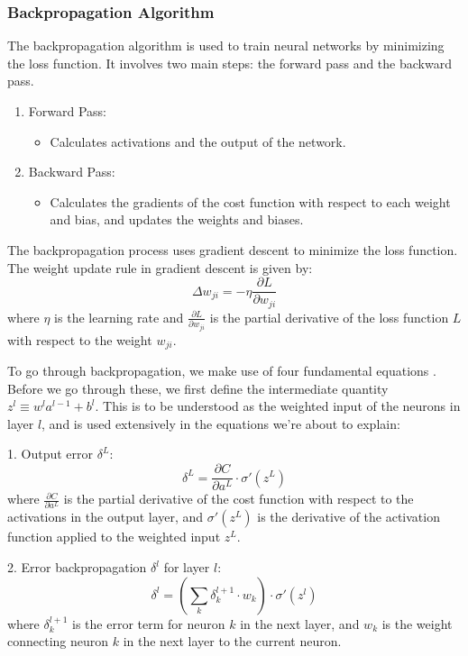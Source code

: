 \documentclass[english,11pt,a4paper,titlepage]{article}
\begin{document}
	\subsubsection*{Backpropagation Algorithm}
	The backpropagation algorithm is used to train neural networks by minimizing the loss function. It involves two main steps: the forward pass and the backward pass. 
	
	\begin{enumerate}
		\item Forward Pass:
		\begin{itemize}
			\item Calculates activations and the output of the network.
		\end{itemize}
		\item Backward Pass:
		\begin{itemize}
			\item Calculates the gradients of the cost function with respect to each weight and bias, and updates the weights and biases.
		\end{itemize}
	\end{enumerate}
	
	The backpropagation process uses gradient descent to minimize the loss function. The weight update rule in gradient descent is given by:
	\begin{equation*}
		\Delta w_{ji} = -\eta \frac{\partial L}{\partial w_{ji}}
	\end{equation*}
	where \( \eta \) is the learning rate and \( \frac{\partial L}{\partial w_{ji}} \) is the partial derivative of the loss function \( L \) with respect to the weight \( w_{ji} \).
	
	To go through backpropagation, we make use of four fundamental equations \cite{nielsenNeuralNetworksandDeepLearning2015}. Before we go through these, we first define the intermediate quantity \( z^l \equiv w^l a^{l-1} + b^l \). This is to be understood as the weighted input of the neurons in layer \( l \), and is used extensively in the equations we're about to explain:
	
	1. Output error \(\delta^L\):
	\[
	\delta^L = \frac{\partial C}{\partial a^L} \cdot \sigma'(z^L)
	\]
    where \( \frac{\partial C}{\partial a^L} \) is the partial derivative of the cost function with respect to the activations in the output layer, and \( \sigma'(z^L) \) is the derivative of the activation function applied to the weighted input \( z^L \).
	
	2. Error backpropagation \(\delta^l\) for layer \( l \):
	\[
    \delta^l = \left( \sum_{k} \delta^{l+1}_k \cdot w_{k} \right) \cdot \sigma'(z^l)
	\]
    where \( \delta^{l+1}_k \) is the error term for neuron \( k \) in the next layer, and \( w_{k} \) is the weight connecting neuron \( k \) in the next layer to the current neuron.
	
\end{document}
